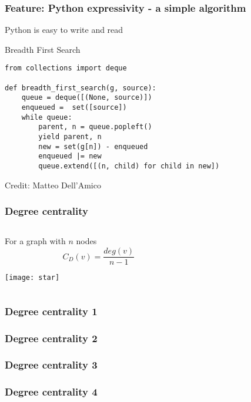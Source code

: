 \documentclass[xcolor=dvipsnames, 9pt]{beamer}
\begin{document}
\begin{frame}[fragile]
\frametitle{Feature: Python expressivity - a simple algorithm}
Python is easy to write and read
\begin{block}{Breadth First Search}
\begin{lstlisting}
from collections import deque

def breadth_first_search(g, source):
    queue = deque([(None, source)])
    enqueued =  set([source])
    while queue:
        parent, n = queue.popleft()
        yield parent, n
        new = set(g[n]) - enqueued
        enqueued |= new
        queue.extend([(n, child) for child in new])
\end{lstlisting}
\end{block}
Credit: Matteo Dell'Amico
\end{frame}


\begin{frame}
\frametitle{Degree centrality}
\begin{columns}
\begin{column}{0.5\textwidth}
For a graph with $n$ nodes
\begin{equation*}
C_D(v) = \frac{deg(v)}{n-1}
\end{equation*}
\centerline{\texttt{[image: star]}}
\end{column}
\begin{column}{0.5\textwidth}



\end{column}
\end{columns}
\end{frame}


\begin{frame}
\frametitle{Degree centrality 1}
\lstset{showspaces=true,
showtabs=true,
tab=\rightarrowfill}

\end{frame}


\begin{frame}
\frametitle{Degree centrality 2}

\end{frame}


\begin{frame}
\frametitle{Degree centrality 3}

\end{frame}


\begin{frame}
\frametitle{Degree centrality 4}

\end{frame}
\end{document}
